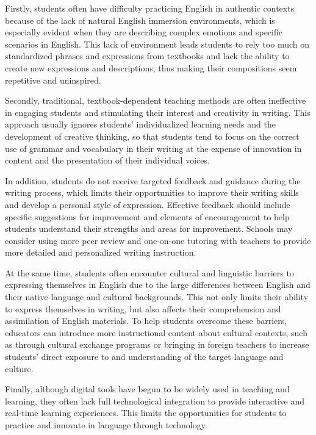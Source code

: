 \documentclass[11pt]{article}
\begin{document}
Firstly, students often have difficulty practicing English in authentic contexts because of the lack of natural English immersion environments, which is especially evident when they are describing complex emotions and specific scenarios in English. This lack of environment leads students to rely too much on standardized phrases and expressions from textbooks and lack the ability to create new expressions and descriptions, thus making their compositions seem repetitive and uninspired.

Secondly, traditional, textbook-dependent teaching methods are often ineffective in engaging students and stimulating their interest and creativity in writing. This approach usually ignores students' individualized learning needs and the development of creative thinking, so that students tend to focus on the correct use of grammar and vocabulary in their writing at the expense of innovation in content and the presentation of their individual voices.

In addition, students do not receive targeted feedback and guidance during the writing process, which limits their opportunities to improve their writing skills and develop a personal style of expression. Effective feedback should include specific suggestions for improvement and elements of encouragement to help students understand their strengths and areas for improvement. Schools may consider using more peer review and one-on-one tutoring with teachers to provide more detailed and personalized writing instruction.

At the same time, students often encounter cultural and linguistic barriers to expressing themselves in English due to the large differences between English and their native language and cultural backgrounds. This not only limits their ability to express themselves in writing, but also affects their comprehension and assimilation of English materials. To help students overcome these barriers, educators can introduce more instructional content about cultural contexts, such as through cultural exchange programs or bringing in foreign teachers to increase students' direct exposure to and understanding of the target language and culture.

Finally, although digital tools have begun to be widely used in teaching and learning, they often lack full technological integration to provide interactive and real-time learning experiences. This limits the opportunities for students to practice and innovate in language through technology.
\end{document}
